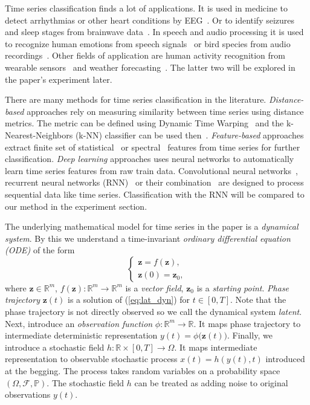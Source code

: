 \documentclass[referee, pdflatex, sn-mathphys-num]{sn-jnl}
\theoremstyle{definition}
\theoremstyle{plain}
\newcommand{\bz}{\ensuremath{\mathbf{z}}}
\begin{document}
		Time series classification finds a lot of applications. It is used in medicine to detect arrhythmias or other heart conditions by EEG~\cite{application_eeg_1}. Or to identify seizures and sleep stages from brainwave data~\cite{application_eeg_2}. In speech and audio processing it is used to recognize human emotions from speech signals~\cite{application_sound_1} or bird species from audio recordings~\cite{application_sound_2}. Other fields of application are human activity recognition from wearable sensors~\cite{application_hac} and weather forecasting~\cite{application_weather}. The latter two will be explored in the paper's experiment later.
		
		There are many methods for time series classification in the literature. \emph{Distance-based} approaches rely on measuring similarity between time series using distance metrics. The metric can be defined using Dynamic Time Warping~\cite{dtw} and the k-Nearest-Neighbors (k-NN) classifier can be used then~\cite{knn_dtw}. \emph{Feature-based} approaches extract finite set of statistical~\cite{stat_feat_1, stat_feat_2} or spectral~\cite{fouirer_feat} features from time series for further classification. \emph{Deep learning} approaches uses neural networks to automatically learn time series features from raw train data. Convolutional neural networks~\cite{application_eeg_1, application_eeg_2}, recurrent neural networks (RNN)~\cite{lstm_feat} or their combination~\cite{application_sound_1, application_hac, application_weather} are designed to process sequential data like time series. Classification with the RNN will be compared to our method in the experiment section.
		
		The underlying mathematical model for time series in the paper is a \emph{dynamical system}. By this we understand a time-invariant \emph{ordinary differential equation (ODE)} of the form
		\begin{equation}\label{eq:lat_dyn}
			\begin{cases}
				\bz = f(\bz), \\
				\bz(0) = \bz_0,
			\end{cases}
		\end{equation}
		where $\bz \in \mathbb{R}^m$, $f(\bz): \mathbb{R}^m \to \mathbb{R}^m$ is a \textit{vector field}, $\bz_0$ is a \textit{starting point}. \textit{Phase trajectory} $\bz(t)$ is a solution of (\ref{eq:lat_dyn}) for $t \in [0, T]$. Note that the phase trajectory is not directly observed so we call the dynamical system \emph{latent}. Next, introduce an \emph{observation function} $\phi: \mathbb{R}^m \to \mathbb{R}$. It maps phase trajectory to intermediate deterministic representation $y(t) = \phi \big( \bz(t) \big)$. Finally, we introduce a stochastic field $h:  \mathbb{R} \times [0, T] \to \Omega$. It maps intermediate representation to observable stochastic process $x(t) = h(y(t), t)$ introduced at the begging. The process takes random variables on a probability space $(\Omega, \mathcal{F}, \mathbb{P})$. The stochastic field $h$ can be treated as adding noise to original observations $y(t)$.
		
\end{document}
